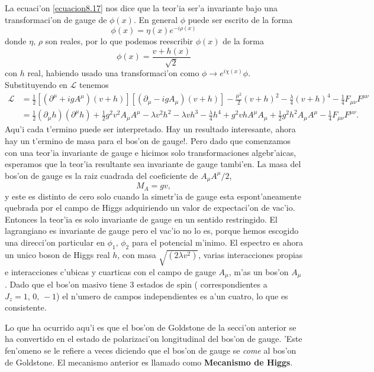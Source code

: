 La ecuaci'on \eqref{ecuacion8.17} nos dice que la teor'ia ser'a invariante bajo una transformaci'on de gauge de $\phi(x)$.
  En general $\phi$ puede ser escrito de la forma
  \begin{equation}
  \phi(x)=\eta(x)e^{-i\rho(x)}
  \end{equation}
  donde $\eta,\,\rho$
  son reales, por lo que podemos reescribir $\phi(x)$
  de la forma
  \begin{equation}
  \phi(x)=\frac{v+h(x)}{\sqrt{2}}
  \end{equation}
  con $h$
  real, habiendo usado una transformaci'on como $\phi\rightarrow e^{i\chi(x)}\phi$.
  Substituyendo en $\mathcal{L}$ tenemos
  \begin{equation}
  \begin{aligned}
  \mathcal{L}&=\frac{1}{2}[(\partial^{\mu}+igA^{\mu})(v+h)][(\partial_{\mu}-igA_{\mu})(v+h)]-\frac{\mu^{2}}{2}(v+h)^{2}-\frac{\lambda}{4}(v+h)^{4}-\frac{1}{4}F_{\mu\nu}F^{\mu\nu}\\
  &=\frac{1}{2}(\partial_{\mu}h)(\partial^{\mu}h)+\frac{1}{2}g^{2}v^{2}A_{\mu}A^{\mu}-\lambda v^{2}h^{2}-\lambda vh^{3}-\frac{\lambda}{4}h^{4}+g^{2}vhA^{\mu}A_{\mu}+\frac{1}{2}g^{2}h^{2}A_{\mu}A^{\mu}-\frac{1}{4}F_{\mu\nu}F^{\mu\nu}.
  \end{aligned}
  \end{equation}
  Aqu'i cada t'ermino puede ser interpretado. Hay un resultado interesante, ahora hay un t'ermino de masa para el bos'on de gauge!. Pero dado que comenzamos con una teor'ia invariante de gauge e hicimos solo transformaciones algebr'aicas, esperamos que la teor'ia resultante sea invariante de gauge tambi'en. La masa del bos'on de gauge es la raiz cuadrada del coeficiente de $A_{\mu}A^{\mu}/2$,
  \begin{equation}
  M_{A}=gv,
  \end{equation}
 y este es distinto de cero solo cuando la simetr'ia de gauge esta espont'aneamente quebrada por el campo de Higgs adquiriendo un valor de expectaci'on de vac'io. Entonces la teor'ia es solo invariante de gauge en un sentido restringido. El lagrangiano es invariante de gauge pero el vac'io no lo es, porque hemos escogido una direcci'on particular en $\phi_{1},\,\phi_{2}$ para el potencial m'inimo.
 El espectro es ahora un unico boson de Higgs real $h$,
  con masa $\sqrt{(2\lambda v^{2})}$, varias interacciones propias e interacciones c'ubicas y cuarticas con el campo de gauge $A_{\mu}$,
  m'as un bos'on $A_{\mu}$.
  Dado que el bos'on masivo tiene 3 estados de spin ( correspondientes a $J_{z}=1,\,0,\,-1$)
  el n'umero de campos independientes es a'un cuatro, lo que es consistente.

Lo que ha ocurrido aqu'i es que el bos'on de Goldstone de la secci'on anterior se ha convertido en el estado de polarizaci'on longitudinal del bos'on de gauge. 'Este fen'omeno se le refiere a veces diciendo que el bos'on de gauge se \textit{come} al bos'on de Goldstone. El mecanismo anterior es llamado como \textbf{Mecanismo de Higgs}.